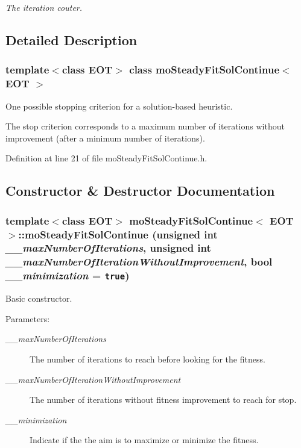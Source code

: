 \begin{CompactItemize}
\begin{CompactList}\small\item\em The iteration couter. \item\end{CompactList}\end{CompactItemize}


\subsection{Detailed Description}
\subsubsection*{template$<$class EOT$>$ class moSteadyFitSolContinue$<$ EOT $>$}

One possible stopping criterion for a solution-based heuristic. 

The stop criterion corresponds to a maximum number of iterations without improvement (after a minimum number of iterations). 



Definition at line 21 of file moSteadyFitSolContinue.h.

\subsection{Constructor \& Destructor Documentation}
\subsubsection{\setlength{\rightskip}{0pt plus 5cm}template$<$class EOT$>$ {\bf moSteadyFitSolContinue}$<$ EOT $>$::{\bf moSteadyFitSolContinue} (unsigned int {\em \_\-\_\-maxNumberOfIterations}, unsigned int {\em \_\-\_\-maxNumberOfIterationWithoutImprovement}, bool {\em \_\-\_\-minimization} = {\tt true})\hspace{0.3cm}{\tt  [inline]}}\label{classmo_steady_fit_sol_continue_0c7e09ca080bfb1dd493015d23a50ad7}


Basic constructor. 

\begin{Desc}
\item[Parameters:]
\begin{description}
\item[{\em \_\-\_\-maxNumberOfIterations}]The number of iterations to reach before looking for the fitness. \item[{\em \_\-\_\-maxNumberOfIterationWithoutImprovement}]The number of iterations without fitness improvement to reach for stop. \item[{\em \_\-\_\-minimization}]Indicate if the the aim is to maximize or minimize the fitness. \end{description}
\end{Desc}


